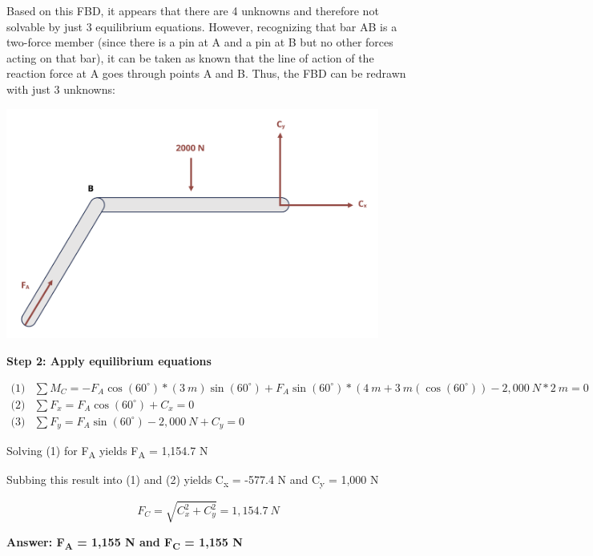 \documentclass[
  letterpaper,
  DIV=11,
  numbers=noendperiod]{scrreprt}
\begin{document}
\begin{tcolorbox}
\begin{tcolorbox}
Based on this FBD, it appears that there are 4 unknowns and therefore
not solvable by just 3 equilibrium equations. However, recognizing that
bar AB is a two-force member (since there is a pin at A and a pin at B
but no other forces acting on that bar), it can be taken as known that
the line of action of the reaction force at A goes through points A and
B. Thus, the FBD can be redrawn with just 3 unknowns:

\begin{center}
\includegraphics[width=4.83333in,height=\textheight]{images/CH1 PNGs/example 1.2 part 3.png}
\end{center}

\textbf{Step 2: Apply equilibrium equations}

\[
\begin{aligned}
\text{(1)}& \sum M_C=-F_A \cos \left(60^{\circ}\right)*(3{~m}) \sin \left(60^{\circ}\right)+F_A \sin \left(60^{\circ}\right) *\left(4{~m}+3{~m}\left(\cos \left(60^{\circ}\right)\right)-2,000{~ N}*2{~m}=0\right. \\
\text{(2)}& \sum F_x=F_A \cos \left(60^{\circ}\right)+C_x=0 \\
\text{(3)}& \sum F_y=F_A \sin \left(60^{\circ}\right)-2,000{~N}+C_y=0
\end{aligned}
\]

Solving (1) for F\textsubscript{A} yields F\textsubscript{A} = 1,154.7 N

Subbing this result into (1) and (2) yields C\textsubscript{x} = -577.4
N and C\textsubscript{y} = 1,000 N

\[
F_C=\sqrt{C_x^2+C_y^2}=1,154.7{~N}
\]

\textbf{Answer: F\textsubscript{A} = 1,155 N and F\textsubscript{C} =
1,155 N}

\end{tcolorbox}

\end{tcolorbox}
\end{document}
